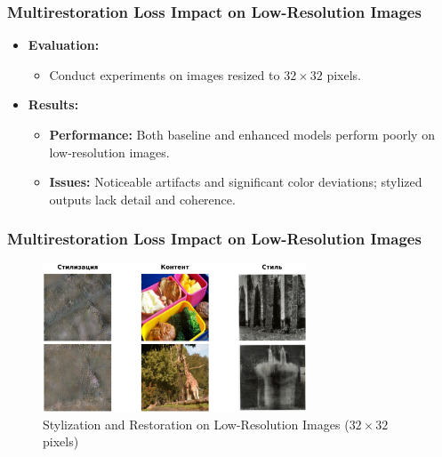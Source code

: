 \begin{frame}
\frametitle{Multirestoration Loss Impact on Low-Resolution Images}

\begin{itemize}
    \item \textbf{Evaluation:}
    \begin{itemize}
        \item Conduct experiments on images resized to \(32 \times 32\) pixels.
    \end{itemize}
    \item \textbf{Results:}
    \begin{itemize}
        \item \textbf{Performance:} Both baseline and enhanced models perform poorly on low-resolution images.
        \item \textbf{Issues:} Noticeable artifacts and significant color deviations; stylized outputs lack detail and coherence.
    \end{itemize}
\end{itemize}
\end{frame}

\begin{frame}
\frametitle{Multirestoration Loss Impact on Low-Resolution Images}
\begin{figure}[H]
    \centering
    \includegraphics[width=0.7\textwidth]{figures/lowres.png}
    \caption{Stylization and Restoration on Low-Resolution Images (\(32 \times 32\) pixels)}
    \label{fig:lowres_results}
\end{figure}
\end{frame}

